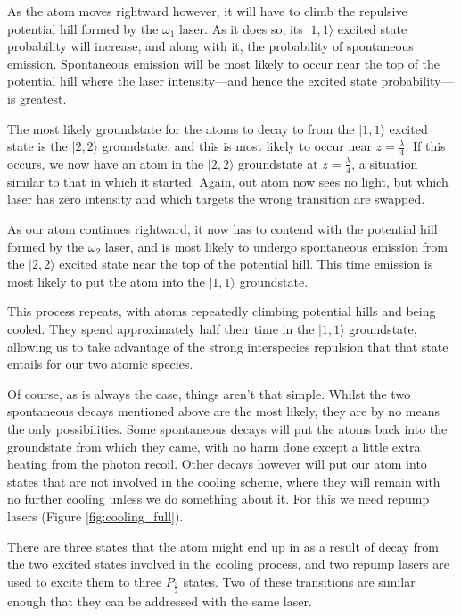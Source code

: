 As the atom moves rightward however, it will have to climb the repulsive potential hill formed by the $\omega_1$ laser. As it does so, its $|1,1\rangle$ excited state probability will increase, and along with it, the probability of spontaneous emission. Spontaneous emission will be most likely to occur near the top of the potential hill where the laser intensity---and hence the excited state probability---is greatest.

The most likely groundstate for the atoms to decay to from the $|1,1\rangle$ excited state is the $|2,2\rangle$ groundstate, and this is most likely to occur near $z=\frac\lambda4$. If this occurs, we now have an atom in the $|2,2\rangle$ groundstate at $z=\frac\lambda4$, a situation similar to that in which it started. Again, out atom now sees no light, but which laser has zero intensity and which targets the wrong transition are swapped.

As our atom continues rightward, it now has to contend with the potential hill formed by the $\omega_2$ laser, and is most likely to undergo spontaneous emission from the $|2,2\rangle$ excited state near the top of the potential hill. This time emission is most likely to put the atom into the $|1,1\rangle$ groundstate.

This process repeats, with atoms repeatedly climbing potential hills and being cooled. They spend approximately half their time in the $|1,1\rangle$ groundstate, allowing us to take advantage of the strong interspecies repulsion that that state entails for our two atomic species.

Of course, as is always the case, things aren't that simple. Whilst the two spontaneous decays mentioned above are the most likely, they are by no means the only possibilities. Some spontaneous decays will put the atoms back into the groundstate from which they came, with no harm done except a little extra heating from the photon recoil. Other decays however will put our atom into states that are not involved in the cooling scheme, where they will remain with no further cooling unless we do something about it. For this we need repump lasers (Figure \ref{fig:cooling_full}).

There are three states that the atom might end up in as a result of decay from the two excited states involved in the cooling process, and two repump lasers are used to excite them to three $P_\frac32$ states. Two of these transitions are similar enough that they can be addressed with the same laser.

